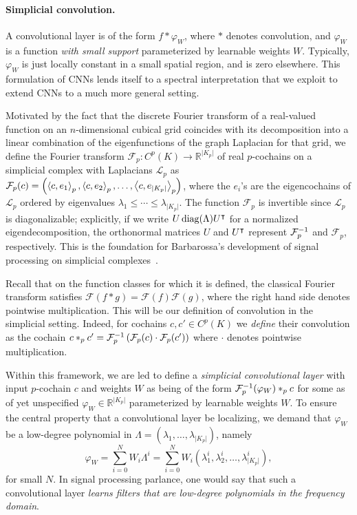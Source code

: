 \paragraph{Simplicial convolution.}
A convolutional layer is of the form $f\ast \varphi_W$, where $\ast$ denotes convolution, and $\varphi_W$ is a function
\emph{with small support} parameterized by learnable weights $W$.
Typically, $\varphi_W$ is just locally constant in a small spatial region, and is zero elsewhere. This formulation of CNNs lends itself to a spectral interpretation that we exploit to extend CNNs to a much more general setting.

Motivated by the fact that the discrete Fourier transform of a real-valued function on an $n$-dimensional cubical grid coincides with its decomposition into a linear combination of the eigenfunctions of the graph Laplacian for that grid, we define the Fourier transform $\mathcal{F}_p: C^p(K) \to \mathbb{R}^{\lvert K_p \rvert}$ of real $p$-cochains on a simplicial complex with Laplacians $\mathcal{L}_p$ as $\mathcal{F}_p(c) = \left(\left\langle c , e_1 \right\rangle_p, \left\langle c , e_2 \right\rangle_p, \dotsc, \left\langle c , e_{\lvert K_p \rvert} \right\rangle_p\right)$, where the $e_i$'s are the eigencochains of $\mathcal{L}_p$ ordered by eigenvalues $\lambda_1\leq\dotsm\leq\lambda_{\lvert K_p \rvert}$. The function $\mathcal{F}_p$ is invertible since $\mathcal{L}_p$ is diagonalizable; explicitly, if we write $U\operatorname{diag}(\Lambda)U^{\intercal}$ for a normalized eigendecomposition, the orthonormal matrices $U$ and $U^{\intercal}$ represent $\mathcal{F}^{-1}_p$ and $\mathcal{F}_p$, respectively. This is the foundation for Barbarossa's development of signal processing on simplicial complexes~\cite{barbarossa2018learning}.

Recall that on the function classes for which it is defined, the classical Fourier transform satisfies $\mathcal{F}(f\ast g)=\mathcal{F}(f)\mathcal{F}(g)$, where the right hand side denotes pointwise multiplication. This will be our definition of convolution in the simplicial setting. Indeed, for cochains $c,c'\in C^p(K)$ we \emph{define} their convolution as the cochain $c\ast_p c' = \mathcal{F}_p^{-1}\left(\mathcal{F}_p(c)\cdot\mathcal{F}_p(c')\right)$ where $\cdot$ denotes pointwise multiplication.

Within this framework, we are led to define a \emph{simplicial convolutional layer} with input $p$-cochain $c$ and weights $W$ as being of the form $\mathcal{F}^{-1}_p(\varphi_W)\ast_p c$ for some as of yet unspecified $\varphi_W\in\mathbb{R}^{\lvert K_p \rvert}$ parameterized by learnable weights $W$. To ensure the central property that a convolutional layer be localizing, we demand that $\varphi_W$ be a low-degree polynomial in $\Lambda=(\lambda_1, \dotsc, \lambda_{\lvert K_p \rvert})$, namely
\begin{equation*}
  \varphi_W = \sum_{i=0}^N W_i\Lambda^i = \sum_{i=0}^N W_i(\lambda^i_1, \lambda^i_2, \dotsc, \lambda^i_{\lvert K_p \rvert}),
\end{equation*}
for small $N$. In signal processing parlance, one would say that such a convolutional layer \emph{learns filters that are low-degree polynomials in the frequency domain}.

